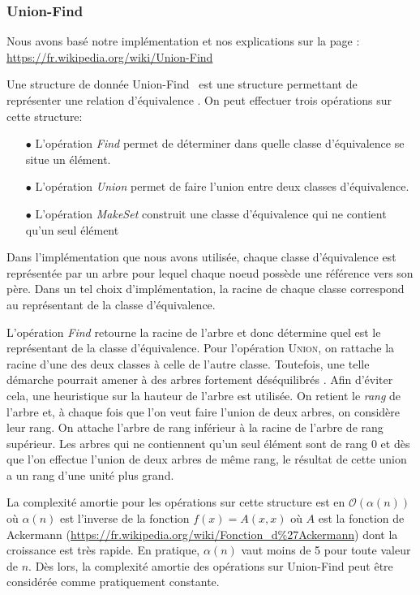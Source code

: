 \subsubsection{Union-Find}
\label{section:unionFind}

Nous avons basé notre implémentation et nos explications sur la page : \url{https://fr.wikipedia.org/wiki/Union-Find}

Une structure de donnée \og Union-Find \fg~est une structure permettant de représenter une relation d'équivalence . On peut effectuer trois opérations sur cette structure:
\begin{itemize}
\item[$\bullet$] L'opération \emph{Find} permet de déterminer dans quelle classe d'équivalence se situe un élément.
\item[$\bullet$] L'opération \emph{Union} permet de faire l'union entre deux classes d'équivalence.
\item[$\bullet$] L'opération \emph{MakeSet} construit une classe d'équivalence qui ne contient qu'un seul élément
\end{itemize}

Dans l'implémentation que nous avons utilisée, chaque classe d'équivalence est représentée par un arbre pour lequel chaque noeud possède une référence vers son père. Dans un tel choix d'implémentation, la racine de chaque classe correspond au représentant de la classe d'équivalence.

L'opération \emph{Find} retourne la racine de l'arbre et donc détermine quel est le représentant de la classe d'équivalence. Pour l'opération \textsc{Union}, on rattache la racine d'une des deux classes à celle de l'autre classe. Toutefois, une telle démarche pourrait amener à des arbres fortement déséquilibrés . Afin d'éviter cela, une heuristique sur la hauteur de l'arbre est utilisée. On retient le \emph{rang} de l'arbre et, à chaque fois que l'on veut faire l'union de deux arbres, on considère leur rang. On attache l'arbre de rang inférieur à la racine de l'arbre de rang supérieur. Les arbres qui ne contiennent qu'un seul élément sont de rang 0 et dès que l'on effectue l'union de deux arbres de même rang, le résultat de cette union a un rang d'une unité plus grand.

La complexité amortie pour les opérations sur cette structure  est en $\mathcal{O}(\alpha (n))$ où $\alpha(n)$ est l'inverse de la fonction $f(x) = A(x,x)$ où $A$ est la fonction de Ackermann (\url{https://fr.wikipedia.org/wiki/Fonction_d%27Ackermann}) dont la croissance est très rapide. En pratique, $\alpha(n)$ vaut moins de 5 pour toute valeur de $n$. Dès lors, la complexité amortie des opérations sur Union-Find peut être considérée comme pratiquement constante.



